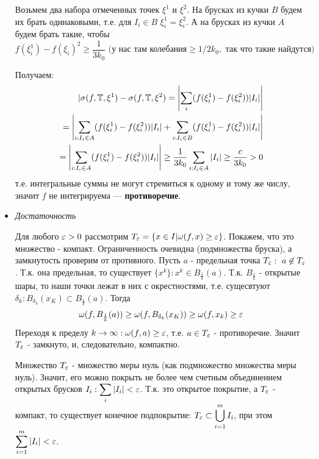 \documentclass[a4paper, 10pt]{article}
\begin{document}
\begin{itemize}
    Возьмем два набора отмеченных точек $\xi^1$ и $\xi^2$. На брусках из кучки $B$ будем их брать одинаковыми, т.е. для $I_i\in B \,\, \xi_i^1 = \xi_i^2$. А на брусках из кучки $A$ будем брать такие, чтобы 
    \begin{equation*}
        f(\xi_i^1) - f(\xi_i)^2 \ge \frac{1}{3k_0} \text{ (у нас там колебания} \ge 1/2k_0, \text{ так что такие найдутся)}
    \end{equation*}

    Получаем:
    \begin{equation*}
        \begin{aligned}
            |\sigma(f, \T, \xi^1) - \sigma(f, \T, \xi^2) 
            = \left|\sum_i(f(\xi_i^1) - f(\xi_i^2))|I_i|\right|\\
            = \left|\sum_{i: I_i\in A}(f(\xi_i^1) - f(\xi_i^2))|I_i| + \sum_{i:I_i\in B}(f(\xi_i^1) - f(\xi_i^2))|I_i|\right|\\
            = \left|\sum_{i: I_i\in A} (f(\xi_i^1) - f(\xi_i^2))|I_i|\right| \ge \frac{1}{3k_0} \sum_{i:I_i\in A}|I_i| \ge \frac{c}{3k_0} > 0
        \end{aligned}
    \end{equation*}
    т.е. интегральные суммы не могут стремиться к одному и тому же числу, значит $f$ не интегрируема --- \textbf{противоречие}.

    \item \textit{Достаточность}

    Для любого $\operatorname{\varepsilon} > 0$ рассмотрим $T_{\operatorname{\varepsilon}} = \{x\in I| \omega(f, x) \ge \operatorname{\varepsilon}\}$. Покажем, что это множество - компакт. Ограниченность очевидна (подмножества бруска), а замкнутость проверим от противного. Пусть $a$ - предельная точка $T_{\operatorname{\varepsilon}}: \,\, a\not\in T_{\operatorname{\varepsilon}}$. Т.к. она предельная, то существует $\{x^k\}: x^k \in B_{\frac{1}{k}}(a)$. Т.к. $B_{\frac{1}{k}}$ - открытые шары, то наши точки лежат в них с окрестностями, т.е. сущесвтуют $\delta_k : B_{\delta_k}(x_K) \subset B_{\frac{1}{k}}(a)$. Тогда
    \begin{equation*}
        \omega(f, B_{\frac{1}{k}}(a)) \ge \omega(f, B_{\delta_k}(x_K)) \ge \omega(f, x_k) \ge \operatorname{\varepsilon}
    \end{equation*}
    Переходя к пределу $k\to\infty : \omega(f, a) \ge \operatorname{\varepsilon}$, т.е. $a\in T_{\operatorname{\varepsilon}}$ - противоречие. Значит $T_{\operatorname{\varepsilon}}$ - замкнуто, и, следовательно, компактно.

    Множество $T_{\operatorname{\varepsilon}}$ - множество меры нуль (как подмножество множества меры нуль). Значит, его можно покрыть не более чем счетным объединением открытых брусков $I_i: \displaystyle\sum_i|I_i| < \ve$. Т.к. это открытое покрытие, а $T_{\operatorname{\varepsilon}}$ - компакт, то существует конечное подпокрытие: $T_{\operatorname{\varepsilon}} \subset \displaystyle\bigcup_{i=1}^m I_i$, при этом $\displaystyle\sum_{i=1}^m |I_i| < \ve$.


\end{itemize}
\end{document}
